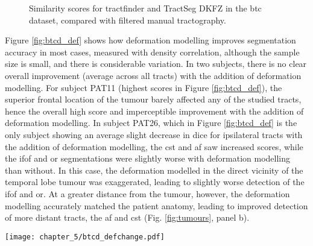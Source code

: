 \begin{figure}[htb!]
  \caption[Similarity scores against tractography for tractfinder and TractSeg in the BTC dataset]{Similarity scores for tractfinder and TractSeg DKFZ in the \gls{btc} dataset, compared with filtered manual tractography.}
  \label{fig:btcd_box}
\end{figure}

Figure \ref{fig:btcd_def} shows how deformation modelling improves segmentation accuracy in most cases, measured with density correlation, although the sample size is small, and there is considerable variation.
In two subjects, there is no clear overall improvement (average across all tracts) with the addition of deformation modelling.
For subject PAT11 (highest scores in Figure \ref{fig:btcd_def}), the superior frontal location of the tumour barely affected any of the studied tracts, hence the overall high score and imperceptible improvement with the addition of deformation modelling.
In subject PAT26, which in Figure \ref{fig:btcd_def} is the only subject showing an average slight decrease in \gls{dice} for ipsilateral tracts with the addition of deformation modelling, the \gls{cst} and \gls{af} saw increased scores, while the \gls{ifof} and \gls{or} segmentations were slightly worse with deformation modelling than without.
In this case, the deformation modelled in the direct vicinity of the temporal lobe tumour was exaggerated, leading to slightly worse detection of the \gls{ifof} and \gls{or}.
At a greater distance from the tumour, however, the deformation modelling accurately matched the patient anatomy, leading to improved detection of more distant tracts, the \gls{af} and \gls{cst} (Fig. \ref{fig:tumours}, panel b).

\begin{SCfigure}[][htb!]
  \texttt{[image: chapter\_5/btcd\_defchange.pdf]}
  \caption[Effect of deformation modelling in the BTC dataset]{Effect of deformation modelling on segmentation accuracy, compared with manually filtered targeted tractography. Each large datapoint represents the average across all tracts for a single subject, and is coloured according to the tumour side. Small datapoints represent individual tracts. In the one subject with a midline tumour, all tracts are considered ipsilateral.}
  \label{fig:btcd_def}
\end{SCfigure}
